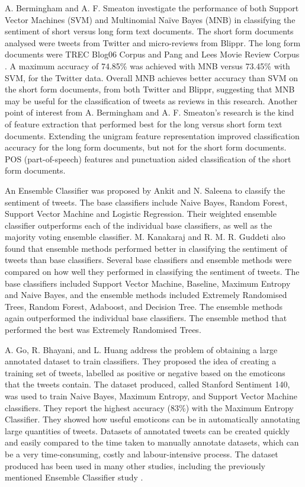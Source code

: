 A. Bermingham and A. F. Smeaton \cite{Berm2010} investigate the performance of both Support Vector Machines (SVM) and Multinomial Naïve Bayes (MNB) in classifying the sentiment of short versus long form text documents. The short form documents analysed were tweets from Twitter and micro-reviews from Blippr. The long form documents were TREC Blog06 Corpus and Pang and Lees Movie Review Corpus \cite{panglee2004}. A maximum accuracy of 74.85\% was achieved with MNB versus 73.45\% with SVM, for the Twitter data. Overall MNB achieves better accuracy than SVM on the short form documents, from both Twitter and Blippr, suggesting that MNB may be useful for the classification of tweets as reviews in this research. Another point of interest from A. Bermingham and A. F. Smeaton's research is the kind of feature extraction that performed best for the long versus short form text documents. Extending the unigram feature representation improved classification accuracy for the long form documents, but not for the short form documents. POS (part-of-speech) features and punctuation aided classification of the short form documents.

An Ensemble Classifier was proposed by Ankit and N. Saleena \cite{Ankit2018} to classify the sentiment of tweets. The base classifiers include Naive Bayes, Random Forest, Support Vector Machine and Logistic Regression. Their weighted ensemble classifier outperforms each of the individual base classifiers, as well as the majority voting ensemble classifier. M. Kanakaraj and R. M. R. Guddeti \cite{Kanakaraj2015} also found that ensemble methods performed better in classifying the sentiment of tweets than base classifiers. Several base classifiers and ensemble methods were compared on how well they performed in classifying the sentiment of tweets. The base classifiers included Support Vector Machine, Baseline, Maximum Entropy and Naive Bayes, and the ensemble methods included Extremely Randomised Trees, Random Forest, Adaboost, and Decision Tree. The ensemble methods again outperformed the individual base classifiers. The ensemble method that performed the best was Extremely Randomised Trees.

A. Go, R. Bhayani, and L. Huang \cite{Go2009} address the problem of obtaining a large annotated dataset to train classifiers. They proposed the  idea of creating a training set of tweets, labelled as positive or negative based on the emoticons that the tweets contain. The dataset produced, called Stanford Sentiment 140, was used to train Naive Bayes, Maximum Entropy, and Support Vector Machine classifiers. They report the highest accuracy (83\%) with the Maximum Entropy Classifier. They showed how useful emoticons can be in automatically annotating large quantities of tweets. Datasets of annotated tweets can be created quickly and easily compared to the time taken to manually annotate datasets, which can be a very time-consuming, costly and labour-intensive process. The dataset produced has been used in many other studies, including the previously mentioned Ensemble Classifier study \cite{Ankit2018}.

